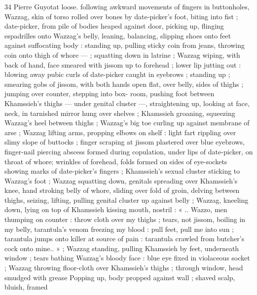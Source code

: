 34 Pierre Guyotat
loose. following awkward movements of fingers in buttonholes,
Wazzag, skin of torso rolled over bones by date-picker's foot, biting
into fist ; date-picker, from pile of bodies heaped against door,
picking up, flinging espadrilles onto Wazzag's belly, leaning,
balancing, slipping shoes onto feet against suffocating body :
standing up, pulling sticky coin from jeans, throwing coin onto thigh
of whore — ; squatting down in latrine ; Wazzag wiping, with back of
hand, face smeared with jissom up to forehead ; lower lip jutting out
: blowing away pubic curls of date-picker caught in eyebrows ;
standing up ; smearing gobs of jissom, with both hands open flat,
over belly, sides of thighs ; jumping over counter, stepping into box-
room, pushing foot between Khamssieh’s thighs — under genital
cluster —, straightening up, looking at face, neck, in tarnished
mirror hung over shelves ; Khamssieh groaning, squeezing Wazzag's
heel between thighs ; Wazzag's big toe curling up against membrane
of arse ; Wazzag lifting arms, propping elbows on shelf : light fart
rippling over slimy slope of buttocks ; finger scraping at jissom
plastered over blue eyebrows, finger-nail piercing abscess formed
during copulation, under lips of date-picker, on throat of whore;
wrinkles of forehead, folds formed on sides of eye-sockets showing
marks of date-picker's fingers ; Khamssieh’s sexual cluster sticking
to Wazzag’s foot ; Wazzag squatting down, genitals spreading over
Khamssieh's knee, hand stroking belly of whore, sliding over fold of
groin, delving between thighs, seizing, lifting, pulling genital cluster
up against belly ; Wazzag, kneeling down, lying on top of Khamssieh
kissing mouth, nostril : « .. Wazzo, men thumping on counter : throw
cloth over my thighs ; tears, not jissom, boiling in my belly,
tarantula's venom freezing my blood : pull feet, pull me into sun ;
tarantula jumps onto killer at source of pain : tarantula crawled from
butcher's cock onto mine.. » ; Wazzag standing, pulling Khamssieh by
feet, underneath window ; tears bathing Wazzag’s bloody face : blue
eye fixed in violaceous socket ; Wazzag throwing floor-cloth over
Khamssieh's thighs ; through window, head smudged with grease
Popping up, body propped against wall ; shaved scalp, bluish, framed

